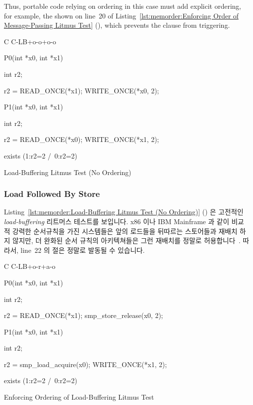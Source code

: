 Thus, portable code relying on ordering in this case must
add explicit ordering, for example, the  shown on
line~20 of
Listing~\ref{lst:memorder:Enforcing Order of Message-Passing Litmus Test}
(), which prevents
the  clause from triggering.
\fi

\begin{listing}[tbp]
{ \scriptsize
\begin{verbbox}[\LstLineNo]
C C-LB+o-o+o-o
{
}

P0(int *x0, int *x1)
{
  int r2;

  r2 = READ_ONCE(*x1);
  WRITE_ONCE(*x0, 2);
}


P1(int *x0, int *x1)
{
  int r2;

  r2 = READ_ONCE(*x0);
  WRITE_ONCE(*x1, 2);
}

exists (1:r2=2 /\ 0:r2=2)
\end{verbbox}
}
\centering
\theverbbox
\caption{Load-Buffering Litmus Test (No Ordering)}
\label{lst:memorder:Load-Buffering Litmus Test (No Ordering)}
\end{listing}

\subsubsection{Load Followed By Store}
\label{sec:memorder:Load Followed By Store}

Listing~\ref{lst:memorder:Load-Buffering Litmus Test (No Ordering)}
()
은 고전적인 \emph{load-buffering} 리트머스 테스트를 보입니다.
x86 이나 IBM Mainframe 과 같이 비교적 강력한 순서규칙을 가진 시스템들은 앞의
로드들을 뒤따르는 스토어들과 재배치 하지 않지만, 더 완화된 순서 규칙의
아키텍쳐들은 그런 재배치를 정말로 허용합니다~\cite{JadeAlglave2011ppcmem}.
따라서, line~22 의  절은 정말로 발동될 수 있습니다.

\begin{listing}[tbp]
{ \scriptsize
\begin{verbbox}[\LstLineNo]
C C-LB+o-r+a-o
{
}

P0(int *x0, int *x1)
{
  int r2;

  r2 = READ_ONCE(*x1);
  smp_store_release(x0, 2);
}


P1(int *x0, int *x1)
{
  int r2;

  r2 = smp_load_acquire(x0);
  WRITE_ONCE(*x1, 2);
}

exists (1:r2=2 /\ 0:r2=2)
\end{verbbox}
}
\centering
\theverbbox
\caption{Enforcing Ordering of Load-Buffering Litmus Test}
\label{lst:memorder:Enforcing Ordering of Load-Buffering Litmus Test}
\end{listing}

